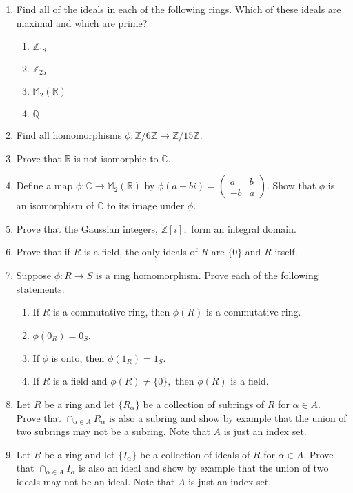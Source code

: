 \documentclass[12pt]{article}
\newcommand{\bbZ}{\mathbb{Z}}
\newcommand{\bbR}{\mathbb{R}}
\newcommand{\bbQ}{\mathbb{Q}}
\newcommand{\bbC}{\mathbb{C}}
\newcommand{\bbM}{\mathbb{M}}
\begin{document}
\begin{enumerate}
\item Find all of  the ideals in each of the following rings. Which of these ideals are maximal and which are prime?
	\begin{enumerate}
	\item $\bbZ_{18}$
	\item $\bbZ_{25}$
	\item $\mathbb{M}_2(\bbR)$
	\item $\bbQ$
	\end{enumerate}
\item Find all homomorphisms $\phi: \mathbb{Z}/6\mathbb{Z} \to  \mathbb{Z}/15\mathbb{Z}.$
\item Prove that $\bbR$ is not isomorphic to $\bbC.$
\item Define a map $\phi: \bbC \to \bbM_2(\bbR)$ by $\phi(a+bi)=\begin{pmatrix} a&b\\-b&a \end{pmatrix}$. Show that $\phi$ is an isomorphism of $\bbC$ to its image under $\phi.$
\item Prove that the Gaussian integers, $\bbZ[i],$ form an integral domain.
\item Prove that if $R$ is a field, the only ideals of $R$ are $\{0\}$ and $R$ itself.
\item Suppose $\phi: R \to S$ is a ring homomorphism. Prove each of the following statements.
	\begin{enumerate}
	\item If $R$ is a commutative ring, then $\phi(R)$ is a commutative ring.
	\item $\phi(0_R)=0_S.$
	\item If $\phi$ is onto, then $\phi(1_R)=1_S.$
	\item If $R$ is a field and $\phi(R)\not=\{0\},$ then $\phi(R)$ is a field.
	\end{enumerate}
\item Let $R$ be a ring and let $\{R_\alpha\}$ be a collection of subrings of $R$ for $\alpha \in A.$ Prove that $ \displaystyle\cap_{\alpha \in A} R_\alpha$ is also a subring and show by example that the union of two subrings may not be a subring. Note that $A$ is just an index set. 
\item Let $R$ be a ring and let $\{I_\alpha\}$ be a collection of ideals of $R$ for $\alpha \in A.$ Prove that $ \displaystyle\cap_{\alpha \in A} I_\alpha$ is also an ideal and show by example that the union of two ideals may not be an ideal. Note that $A$ is just an index set.
\end{enumerate}
\end{document}
